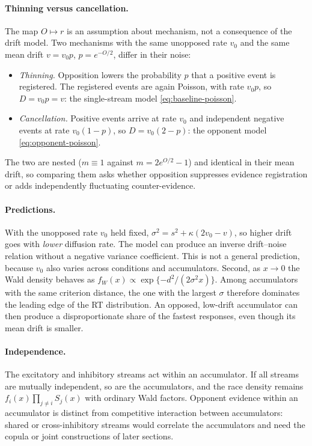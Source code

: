 \documentclass[12pt]{article}
\begin{document}
\paragraph{Thinning versus cancellation.}
The map $O\mapsto r$ is an assumption about mechanism, not a consequence of the drift model. Two mechanisms with the same unopposed rate $v_0$ and the same mean drift $v=v_0p$, $p=e^{-O/2}$, differ in their noise:
\begin{itemize}
  \item \emph{Thinning.} Opposition lowers the probability $p$ that a positive event is registered. The registered events are again Poisson, with rate $v_0p$, so $D=v_0p=v$: the single-stream model
  \eqref{eq:baseline-poisson}.
  \item \emph{Cancellation.} Positive events arrive at rate $v_0$ and independent negative events at rate $v_0(1-p)$, so $D=v_0(2-p)$: the opponent model \eqref{eq:opponent-poisson}.
\end{itemize}
The two are nested ($m\equiv1$ against $m=2e^{O/2}-1$) and identical in their mean drift, so comparing them asks whether opposition suppresses evidence registration or adds independently fluctuating counter-evidence.

\paragraph{Predictions.}
With the unopposed rate $v_0$ held fixed, $\sigma^2=s^2+\kappa(2v_0-v)$, so higher drift goes with \emph{lower} diffusion rate. The model can produce an inverse drift--noise relation without a negative variance coefficient. This is not a general prediction, because $v_0$ also varies across conditions and accumulators. Second, as $x\to0$ the Wald density behaves as $f_W(x)\propto\exp\{-d^2/(2\sigma^2x)\}$. Among accumulators with the same criterion distance, the one with the largest $\sigma$ therefore dominates the leading edge of the RT distribution. An opposed, low-drift accumulator can then produce a disproportionate share of the fastest responses, even though its mean drift is smaller.

\paragraph{Independence.}
The excitatory and inhibitory streams act within an accumulator. If all streams are mutually independent, so are the accumulators, and the race density remains $f_i(x)\prod_{j\ne i}S_j(x)$ with ordinary Wald factors. Opponent evidence within an accumulator is distinct from competitive interaction between accumulators: shared or cross-inhibitory streams would correlate the accumulators and need the copula or joint constructions of later sections.
\end{document}
